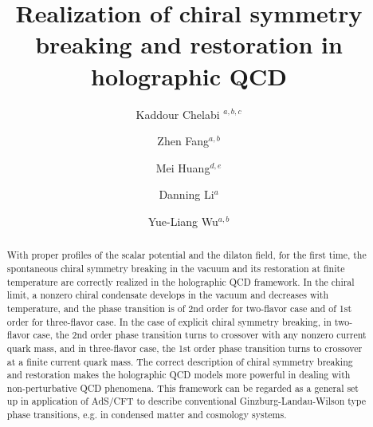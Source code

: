 \documentclass[aps,prd,showpacs,preprintnumbers,twocolumn]{revtex4}
\begin{document}
\title{Realization of chiral symmetry breaking and restoration in holographic QCD}
\author{Kaddour Chelabi $^{a,b,c}$}
\author{Zhen Fang$^{a,b}$}
\author{Mei Huang$^{d,e}$}
\author{Danning Li$^{a}$}
\author{Yue-Liang Wu$^{a,b}$}

\begin{abstract}
With proper profiles of the scalar potential and the dilaton field,  for the first time, the spontaneous chiral symmetry breaking
in the vacuum and its restoration at finite temperature are correctly realized in the holographic QCD framework.
In the chiral limit, a nonzero chiral condensate develops in the vacuum and decreases with temperature, and the phase transition
is of 2nd order for two-flavor case and of 1st order for three-flavor case. In the case of explicit chiral symmetry breaking,
in two-flavor case, the 2nd order phase transition turns to crossover with any nonzero current quark mass, and in three-flavor case,
the 1st order phase transition turns to crossover at a finite current quark mass. The correct description of chiral symmetry breaking
and restoration makes the holographic QCD models more powerful in dealing with non-perturbative QCD phenomena.
This framework can be regarded as a general set up in application of AdS/CFT to describe conventional Ginzburg-Landau-Wilson
type phase transitions, e.g. in condensed matter and cosmology systems.
\end{abstract}
\maketitle
\end{document}
